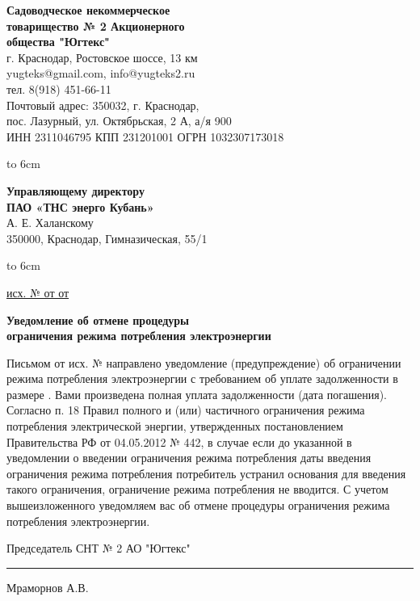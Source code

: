 \noindent\parbox[l][71mm]{80mm}
{
	 \begin{center}
 {\small \textbf{Садоводческое некоммерческое\\ товарищество
 	№  2 Акционерного\\ общества "Югтекс"\\
 }}
 \footnotesize{г. Краснодар, Ростовское шоссе, 13 км\\
 	yugteks@gmail.com, info@yugteks2.ru\\
 	тел. 8(918) 451-66-11\\
 	Почтовый адрес: 350032, г. Краснодар,\\ пос. Лазурный, ул. Октябрьская, 2 А, а/я   900
  }\\
 {ИНН 2311046795 КПП 231201001 ОГРН 1032307173018}
		\end{center}
\hbox to 6cm{ }}\hfill
\parbox[l][71mm]{65mm}
{ \begin{center}
	\small{
	\textbf{Управляющему директору\\ ПАО «ТНС энерго Кубань»}\\
	\vspace{3mm}
	А. Е. Халанскому\\
	\vspace{3mm}
 {\footnotesize 350000, Краснодар, Гимназическая, 55/1}

	}
\end{center}
\hbox to 6cm{ }}
\linebreak
\vspace{-12mm}

\underline{исх. №  от от } 

\vspace{5mm}
\begin{center}
	\Large\textbf{Уведомление об отмене процедуры\\ 
		ограничения режима потребления электроэнергии}
\end{center}
\par
\vspace{5mm}



Письмом от          исх.  №         направлено уведомление (предупреждение) об  ограничении режима потребления электроэнергии с требованием об уплате задолженности в размере  .
Вами произведена полная уплата задолженности                (дата погашения).
Согласно п. 18 Правил полного и (или) частичного ограничения режима потребления электрической энергии, утвержденных постановлением Правительства РФ от 04.05.2012 № 442, в случае если до указанной в уведомлении о введении ограничения режима потребления даты введения ограничения режима потребления потребитель устранил основания для введения такого ограничения, ограничение режима потребления не вводится.
С учетом вышеизложенного уведомляем вас об отмене процедуры ограничения режима потребления электроэнергии. 
\vspace{5mm}



\vspace{15mm}
\noindent Председатель СНТ № 2 АО "Югтекс" \hfill    \rule{3cm}{0.1 mm}    Мраморнов А.В.

\pagebreak

